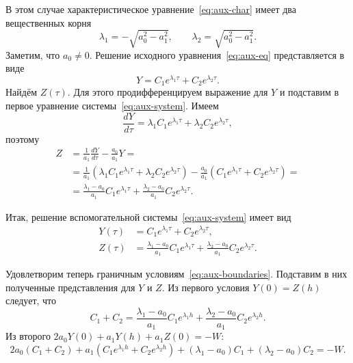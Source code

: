 \documentclass[a4paper,14pt]{article}
\begin{document}
В этом случае характеристическое уравнение~\eqref{eq:aux-char}
имеет два вещественных корня
\begin{equation*}
  \lambda_1 = - \sqrt{ a_0^2 - a_1^2 },
  \qquad
  \lambda_2 = \sqrt{ a_0^2 - a_1^2 }.
\end{equation*}
Заметим, что $a_0 \neq 0$. Решение исходного
уравнения~\eqref{eq:aux-eq} представляется в виде
\begin{equation*}
  Y = C_1 e^{\lambda_1 \tau} + C_2 e^{\lambda_2 \tau}.
\end{equation*}
Найдём $Z(\tau)$. Для этого продифференцируем выражение для $Y$
и подставим в первое уравнение системы~\eqref{eq:aux-system}.
Имеем
\begin{equation*}
  \frac{d Y}{d \tau}
  = \lambda_1 C_1 e^{\lambda_1 \tau}
  + \lambda_2 C_2 e^{\lambda_2 \tau},
\end{equation*}
поэтому
\begin{equation*}
  \begin{aligned}
    Z
    &=
      \frac{1}{a_1} \frac{d Y}{d \tau} - \frac{a_0}{a_1} Y = \\
    &=
      \frac{1}{a_1} \left(
      \lambda_1 C_1 e^{\lambda_1 \tau}
      + \lambda_2 C_2 e^{\lambda_2 \tau}
      \right)
      - \frac{a_0}{a_1} \left(
      C_1 e^{\lambda_1 \tau} + C_2 e^{\lambda_2 \tau}
      \right) = \\
    &=
      \frac{\lambda_1 - a_0}{a_1} C_1 e^{\lambda_1 \tau}
      +
      \frac{\lambda_2 - a_0}{a_1} C_2 e^{\lambda_2 \tau}.
  \end{aligned}
\end{equation*}

Итак, решение вспомогательной системы~\eqref{eq:aux-system}
имеет вид
\begin{equation}
  \label{eq:aux-system-gen-solution}
  \begin{aligned}
    Y(\tau) &= C_1 e^{\lambda_1 \tau} + C_2 e^{\lambda_2 \tau}, \\
    Z(\tau) &=
              \frac{\lambda_1 - a_0}{a_1} C_1 e^{\lambda_1 \tau}
              +
              \frac{\lambda_2 - a_0}{a_1} C_2 e^{\lambda_2 \tau}.
  \end{aligned}
\end{equation}

Удовлетворим теперь граничным условиям~\eqref{eq:aux-boundaries}.
Подставим в них полученные представления для $Y$ и $Z$. Из
первого условия $Y(0) = Z(h)$ следует, что
\begin{equation*}
  C_1 + C_2 =
  \frac{\lambda_1 - a_0}{a_1} C_1 e^{\lambda_1 h}
  +
  \frac{\lambda_2 - a_0}{a_1} C_2 e^{\lambda_2 h}.
\end{equation*}
Из второго $2 a_0 Y(0) + a_1 Y(h) + a_1 Z(0) = -W$:
\begin{equation*}
  2 a_0 (C_1 + C_2) + a_1 \left(
    C_1 e^{\lambda_1 h} + C_2 e^{\lambda_2 h}
  \right)
  +
  (\lambda_1 - a_0) C_1 + (\lambda_2 - a_0) C_2 = -W.
\end{equation*}
\end{document}
